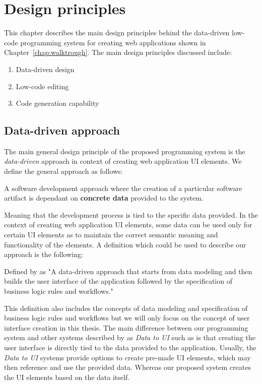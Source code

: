 \chapter{Design principles}
\label{chap:design}

This chapter describes the main design principles behind the data-driven low-code programming system for creating web applications shown in Chapter~\ref{chap:walktrough}.
The main design principles discussed include:
\begin{enumerate}
	\item Data-driven design
	\item Low-code editing
	\item Code generation capability
\end{enumerate}

\section{Data-driven approach}

The main general design principle of the proposed programming system is the \emph{data-driven} approach in context of creating web application UI elements.
We define the general approach as follows:
\begin{defn}
	A software development approach where the creation of a particular software artifact is dependant on \textbf{concrete data} provided to the system.
\end{defn}

Meaning that the development process is tied to the specific data provided.
In the context of creating web application UI elements, some data can be used only for certain UI elements as to maintain the correct semantic meaning and functionality of the elements.
A definition which could be used to describe our approach is the following:

\begin{defn}[Data to UI]
	Defined by \citet{Sahay_Indamutsa_Di} as "A data-driven approach that starts from data modeling and then builds the user interface of the application followed by the specification of business logic rules and workflows."
\end{defn}

This definition also includes the concepts of data modeling and specification of business logic rules and workflows but we will only focus on the concept of user interface creation in this thesis.
The main difference between our programming system and other systems described by \citet{Sahay_Indamutsa_Di} as \emph{Data to UI} such as \citet{mendix} is that creating the user interface is directly tied to the data provided to the application.
Usually, the \emph{Data to UI} systems provide options to create pre-made UI elements, which may then reference and use the provided data.
Whereas our proposed system creates the UI elements based on the data itself.

